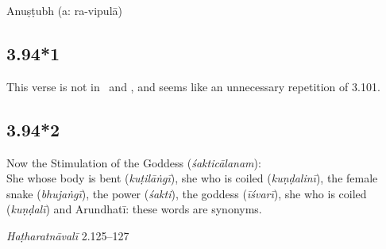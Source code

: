 \begin{ekdosis}
\begin{testimonia}[hp03_094]
\end{testimonia}

%

\begin{metre}[hp03_094]
Anuṣṭubh (a: ra-vipulā)
\end{metre}

\subsection*{3.94*1}
\begin{philcomm}[hp03_094_1]
This verse is not in \textalpha\ and \textgamma, and seems like an unnecessary repetition of 3.101.
\end{philcomm}

\subsection*{3.94*2}
\begin{translation}[hp03_094_2]
Now the Stimulation of the Goddess (\emph{śakticālanam}):\\ 
She whose body is bent (\emph{kuṭilāṅgī}), she who is coiled (\emph{kuṇḍalinī}), the female snake (\emph{bhujaṅgī}), the power (\emph{śakti}), the goddess (\emph{īśvarī}), she who is coiled (\emph{kuṇḍalī}) and Arundhatī: these words are synonyms.
\end{translation}
% 

\begin{testimonia}[hp03_094_2]

\emph{Haṭharatnāvalī} 2.125–127
\begin{versinnote}
\end{versinnote}


\end{testimonia}
\end{ekdosis}
